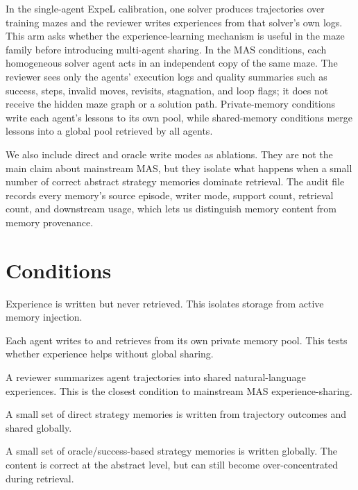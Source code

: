 \documentclass[11pt]{article}
\begin{document}
In the single-agent ExpeL calibration, one solver produces trajectories over training mazes and the reviewer writes experiences from that solver's own logs. This arm asks whether the experience-learning mechanism is useful in the maze family before introducing multi-agent sharing. In the MAS conditions, each homogeneous solver agent acts in an independent copy of the same maze. The reviewer sees only the agents' execution logs and quality summaries such as success, steps, invalid moves, revisits, stagnation, and loop flags; it does not receive the hidden maze graph or a solution path. Private-memory conditions write each agent's lessons to its own pool, while shared-memory conditions merge lessons into a global pool retrieved by all agents.

We also include direct and oracle write modes as ablations. They are not the main claim about mainstream MAS, but they isolate what happens when a small number of correct abstract strategy memories dominate retrieval. The audit file records every memory's source episode, writer mode, support count, retrieval count, and downstream usage, which lets us distinguish memory content from memory provenance.

\section{Conditions}

\begin{description}[leftmargin=2.2cm, style=nextline]
    \item[Frozen] Experience is written but never retrieved. This isolates storage from active memory injection.
    \item[Private fixed] Each agent writes to and retrieves from its own private memory pool. This tests whether experience helps without global sharing.
    \item[Shared reviewer] A reviewer summarizes agent trajectories into shared natural-language experiences. This is the closest condition to mainstream MAS experience-sharing.
    \item[Shared direct] A small set of direct strategy memories is written from trajectory outcomes and shared globally.
    \item[Shared oracle] A small set of oracle/success-based strategy memories is written globally. The content is correct at the abstract level, but can still become over-concentrated during retrieval.
\end{description}
\end{document}

